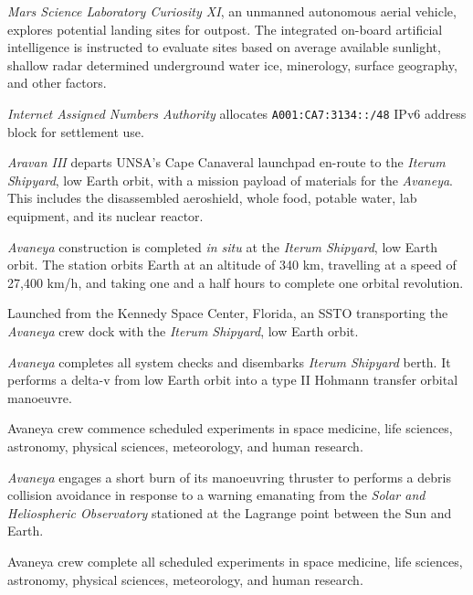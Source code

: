 {\it Mars Science Laboratory Curiosity XI}, an unmanned autonomous aerial vehicle, explores potential landing sites for outpost. The integrated on-board artificial intelligence is instructed to evaluate sites based on average available sunlight, shallow radar determined underground water ice, minerology, surface geography, and other factors.
\StopTimelineDate

{\it Internet Assigned Numbers Authority} allocates {\tt A001:CA7:3134::/48} IPv6 address block for settlement use. 
\StopTimelineDate

{\it Aravan III} departs UNSA's Cape Canaveral launchpad en-route to the {\it Iterum Shipyard}, low Earth orbit, with a mission payload of materials for the {\it Avaneya}. This includes the disassembled aeroshield, whole food, potable water, lab equipment, and its nuclear reactor.
\StopTimelineDate

{\it Avaneya} construction is completed {\it in situ} at the {\it Iterum Shipyard}, low Earth orbit. The station orbits Earth at an altitude of 340 km, travelling at a speed of 27,400 km/h, and taking one and a half hours to complete one orbital revolution.
\StopTimelineDate

Launched from the Kennedy Space Center, Florida, an SSTO transporting the {\it Avaneya} crew dock with the {\it Iterum Shipyard}, low Earth orbit.
\StopTimelineDate

{\it Avaneya} completes all system checks and disembarks {\it Iterum Shipyard} berth. It performs a delta-v from low Earth orbit into a type II Hohmann transfer orbital manoeuvre.
\StopTimelineDate

Avaneya crew commence scheduled experiments in space medicine, life sciences, astronomy, physical sciences, meteorology, and human research.
\StopTimelineDate

{\it Avaneya} engages a short burn of its manoeuvring thruster to performs a debris collision avoidance in response to a warning emanating from the {\it Solar and Heliospheric Observatory} stationed at the Lagrange  point between the Sun and Earth.
\StopTimelineDate

Avaneya crew complete all scheduled experiments in space medicine, life sciences, astronomy, physical sciences, meteorology, and human research.
\StopTimelineDate

